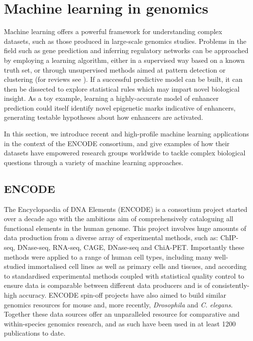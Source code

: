 \documentclass[a4paper,11pt,oneside]{book}
\begin{document}


\section{Machine learning in genomics}\label{intro:ml}

Machine learning offers a powerful framework for understanding complex datasets, such as those produced in large-scale genomics studies. Problems in the field such as gene prediction and inferring regulatory networks can be approached by employing a learning algorithm, either in a supervised way based on a known truth set, or through unsupervised methods aimed at pattern detection or clustering (for reviews see ). If a successful predictive model can be built, it can then be dissected to explore statistical rules which may impart novel biological insight. As a toy example, learning a highly-accurate model of enhancer prediction could itself identify novel epigenetic marks indicative of enhancers, generating testable hypotheses about how enhancers are activated.

In this section, we introduce recent and high-profile machine learning applications in the context of the ENCODE consortium, and give examples of how their datasets have empowered research groups worldwide to tackle complex biological questions through a variety of machine learning approaches. 

\subsection{ENCODE}\label{intro:encode}

The Encyclopaedia of DNA Elements (ENCODE) is a consortium project started over a decade ago with the ambitious aim of comprehensively cataloguing all functional elements in the human genome.\cite{Feingold2004, Qu2013, Dunham2012} This project involves huge amounts of data production from a diverse array of experimental methods, such as: ChIP-seq, DNase-seq, RNA-seq, CAGE, DNase-seq and ChiA-PET.\cite{Myers2011} Importantly these methods were applied to a range of human cell types, including many well-studied immortalised cell lines as well as primary cells and tissues, and according to standardised experimental methods\cite{Landt2012} coupled with statistical quality control\cite{Dunham2012, Boyle2014, Marinov2013} to ensure data is comparable between different data producers and is of consistently-high accuracy. ENCODE spin-off projects have also aimed to build similar genomics resources for mouse\cite{Yue2014} and, more recently, \emph{Drosophila} and \emph{C. elegans}.\cite{Ho2014} Together these data sources offer an unparalleled resource for comparative and within-species genomics research, and as such have been used in at least 1200 publications to date.\cite{encodenews}
\end{document}
